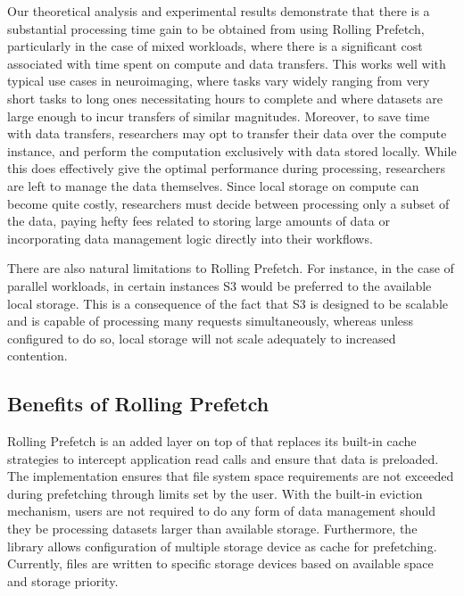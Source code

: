 Our theoretical analysis and experimental results demonstrate that there is a
substantial processing time gain to be obtained from using Rolling Prefetch,
particularly in the case of mixed workloads, where there is a significant cost
associated with time spent on compute and data transfers. This works well with
typical use cases in neuroimaging, where tasks vary widely ranging from very
short tasks to long ones necessitating hours to complete and where datasets are
large enough to incur transfers of similar magnitudes. Moreover, to save time
with data transfers, researchers may opt to transfer their data over the compute
instance, and perform the computation exclusively with data stored locally.
While this does effectively give the optimal performance during processing,
researchers are left to manage the data themselves. Since local storage on
compute can become quite costly, researchers must decide between processing only
a subset of the data, paying hefty fees related to storing large amounts of data
or incorporating data management logic directly into their workflows. 

There are also natural limitations to Rolling Prefetch. For instance, in the
case of parallel workloads, in certain instances S3 would be preferred to the
available local storage. This is a consequence of the fact that S3 is designed
to be scalable and is capable of processing many requests simultaneously,
whereas unless configured to do so, local storage will not scale adequately to
increased contention.


\subsection{Benefits of Rolling Prefetch}

Rolling Prefetch is an added layer on top of \sfs that replaces its built-in
cache strategies to intercept application read calls and ensure that data is
preloaded. The implementation ensures that file system space requirements are not
exceeded during prefetching through limits set by the user. With the built-in
eviction mechanism, users are not required to do any form of data management
should they be processing datasets larger than available storage. Furthermore,
the library allows configuration of multiple storage device as cache for
prefetching. Currently, files are written to specific storage devices based on
available space and storage priority.


